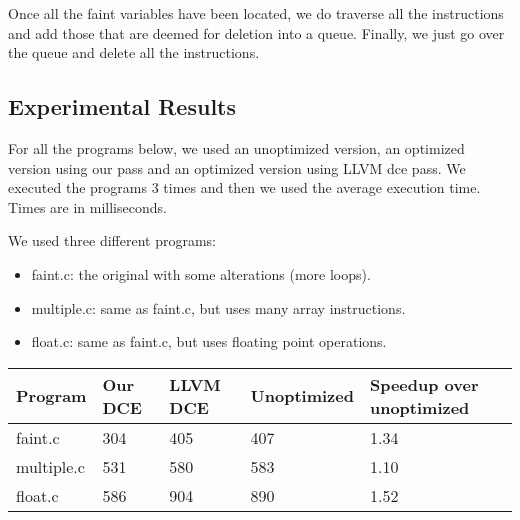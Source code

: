 \documentclass[12pt]{article}
\begin{document}
Once all the faint variables have been located, we do traverse all the instructions and add those that are deemed for deletion into a queue. Finally, we just go over the queue and delete all the instructions.

\subsection{Experimental Results}

For all the programs below, we used an unoptimized version, an optimized version using our pass and an optimized version using LLVM dce pass. We executed the programs 3 times and then we used the average execution time. Times are in milliseconds.

We used three different programs:

\begin{itemize}
   \item faint.c: the original with some alterations (more loops).
   \item multiple.c: same as faint.c, but uses many array instructions.
   \item float.c: same as faint.c, but uses floating point operations.
\end{itemize}

\begin{center}
    \begin{tabular}{ | l | l | l | l | l |}
    \hline
    Program & Our DCE & LLVM DCE & Unoptimized & Speedup over unoptimized \\ \hline
    faint.c & 304 & 405 & 407 & 1.34 \\ \hline
    multiple.c & 531 & 580 & 583 & 1.10 \\ \hline
    float.c & 586 & 904 & 890 & 1.52 \\ \hline
    \hline
    \end{tabular}
\end{center}
\end{document}
